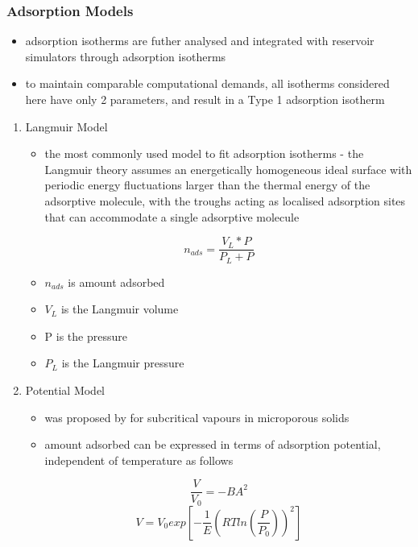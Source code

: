 \documentclass[11pt]{article}
\begin{document}
\subsubsection{Adsorption Models}
\label{sec:org4d9301b}
\begin{itemize}
\item adsorption isotherms are futher analysed and integrated with reservoir simulators through adsorption isotherms
\item to maintain comparable computational demands, all isotherms considered here have only 2 parameters, and result in a Type 1 adsorption isotherm \cite{Sing1985}
\end{itemize}
\begin{enumerate}
\item Langmuir Model
\label{sec:org2c7835f}
\begin{itemize}
\item the most commonly used model to fit adsorption isotherms - the Langmuir theory assumes an energetically homogeneous ideal surface with periodic energy fluctuations larger than the thermal energy of the adsorptive molecule, with the troughs acting as localised adsorption sites that can accommodate a single adsorptive molecule \cite{Langmuir1918}
\end{itemize}
\begin{equation}
n_{ads} = \frac{V_L*P}{P_L + P}
\end{equation}
\begin{itemize}
\item \(n_{ads}\) is amount adsorbed
\item \(V_L\) is the Langmuir volume
\item P is the pressure
\item \(P_L\) is the Langmuir pressure
\end{itemize}
\item Potential Model
\label{sec:orgd27d739}
\begin{itemize}
\item was proposed by \cite{Dubinin1960} for subcritical vapours in microporous solids
\item amount adsorbed can be expressed in terms of adsorption potential, independent of temperature as follows
\end{itemize}
\begin{equation}
\frac{V}{V_0} = - B A ^2
\end{equation}
\begin{equation}
V = V_0 exp[-\frac{1}{E} (R T ln (\frac{P}{P_0}))^2]

\end{equation}
\end{enumerate}
\end{document}
